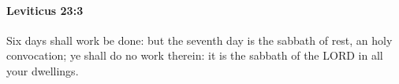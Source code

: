 
		\paragraph{Leviticus 23:3} %
			\label{LEVITICUS-23-3}

			Six days shall work be done: but the seventh day is the sabbath of rest, an holy convocation; ye shall do no work therein: it is the sabbath of the LORD in all your dwellings.


